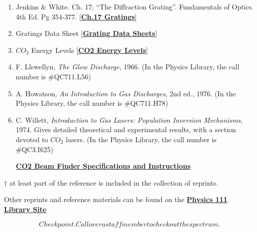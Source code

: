 \documentclass{../lab}
\begin{document}
\begin{enumerate}
    \item Jenkins \& White. Ch. 17; ``The Diffraction Grating''. Fundamentals of Optics. 4th Ed. Pg 354-377. [\href{http://physics111.lib.berkeley.edu/Physics111/Reprints/CO2/OCR\%20ch.\%2017\%20the\%20diffraction\%20grating.pdf}{\textbf{Ch.17 Gratings}}]
    \item Gratings Data Sheet [\href{http://physics111.lib.berkeley.edu/Physics111/Reprints/CO2/grating.pdf}{\textbf{Grating Data Sheets}}]
    \item $CO_2 $ Energy Levels [\href{http://physics111.lib.berkeley.edu/Physics111/Reprints/CO2/CO\_2\%20Energy\%20Levels.pdf}{\textbf{CO2 Energy Levels}}]
    \item F. Llewellyn, \emph{The Glow Discharge}, 1966. (In the Physics Library, the call number is \#QC711.L56)
    \item A. Howatson, \emph{An Introduction to Gas Discharges,} 2nd ed., 1976.  (In the Physics Library, the call number is \#QC711.H78)
    \item C. Willett, \emph{Introduction to Gas Lasers: Population Inversion Mechanisms,} 1974. Gives detailed theoretical and experimental results, with a section devoted to $CO_2 $ lasers.  (In the Physics Library, the call number is \#QC3.I625)
    \item [\href{http://physics111.lib.berkeley.edu/Physics111/Reprints/CO2/CO2\_beam\_finder\_instructions.pdf}{\textbf{CO2 Beam Finder Specifications and Instructions}}]
\end{enumerate}

† at least part of the reference is included in the collection of reprints.

Other reprints and reference materials can be found on the \href{http://physics111.lib.berkeley.edu/Physics111/Reprints/CO2/CO2\_index.html}{\textbf{Physics 111 Library Site}}

\begin{equation}
     Checkpoint. Call over a staff member to check out the spectrum.
\end{equation}
\end{document}
